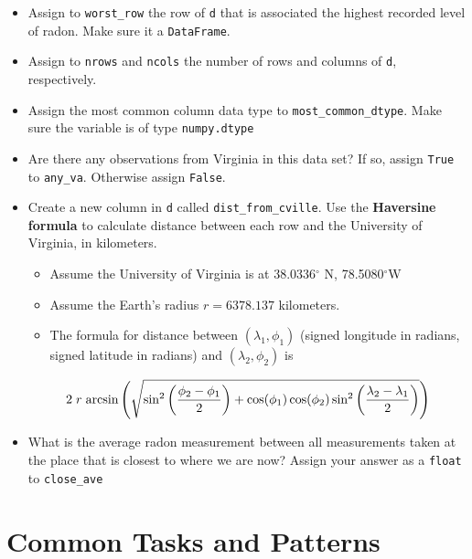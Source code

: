 \documentclass[
  12pt,
  krantz2]{krantz}
\providecommand{\tightlist}{%
  \setlength{\itemsep}{0pt}\setlength{\parskip}{0pt}}
\begin{document}
\begin{itemize}
\tightlist
\item
  Assign to \texttt{worst\_row} the row of \texttt{d} that is associated the highest recorded level of radon. Make sure it a \texttt{DataFrame}.
\item
  Assign to \texttt{nrows} and \texttt{ncols} the number of rows and columns of \texttt{d}, respectively.
\item
  Assign the most common column data type to \texttt{most\_common\_dtype}. Make sure the variable is of type \texttt{numpy.dtype}
\item
  Are there any observations from Virginia in this data set? If so, assign \texttt{True} to \texttt{any\_va}. Otherwise assign \texttt{False}.
\item
  Create a new column in \texttt{d} called \texttt{dist\_from\_cville}. Use the \textbf{Haversine formula} to calculate distance between each row and the University of Virginia, in kilometers.

  \begin{itemize}
  \tightlist
  \item
    Assume the University of Virginia is at 38.0336\(^\circ\) N, 78.5080\(^\circ\)W
  \item
    Assume the Earth's radius \(r = 6378.137\) kilometers.
  \item
    The formula for distance between \((\lambda_1, \phi_1)\) (signed longitude in radians, signed latitude in radians) and \((\lambda_2, \phi_2)\) is
  \end{itemize}

  \begin{equation}
  2 \hspace{1mm} r \hspace{1mm} \text{arcsin}\left( \sqrt{ \sin^2\left( \frac{\phi_2 - \phi_1}{2}\right)  + \cos(\phi_1)\cos(\phi_2) \sin^2\left( \frac{\lambda_2 - \lambda_1}{2} \right)  } \right)
  \end{equation}
\item
  What is the average radon measurement between all measurements taken at the place that is closest to where we are now? Assign your answer as a \texttt{float} to \texttt{close\_ave}
\end{itemize}

\hypertarget{part-common-tasks-and-patterns}{%
\part{Common Tasks and Patterns}\label{part-common-tasks-and-patterns}}
\end{document}

